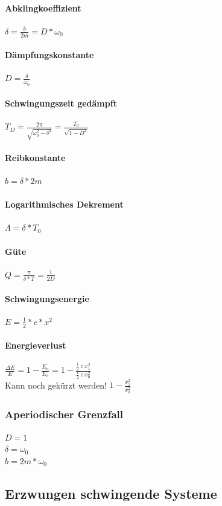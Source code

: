 \documentclass[12pt, a4paper]{scrreprt}
\begin{document}
\paragraph{Abklingkoeffizient} \dotfill \(\delta=\frac{b}{2m}=D*\omega_0\)
\paragraph{Dämpfungskonstante} \dotfill \(D=\frac{\delta}{\omega_0}\)
\paragraph{Schwingungszeit gedämpft} \dotfill \(T_D=\frac{2\pi}{\sqrt{\omega_0^2-\delta^2}}=\frac{T_0}{\sqrt{1-D^2}}\)
\paragraph{Reibkonstante} \dotfill \(b=\delta * 2m\)
\paragraph{Logarithmisches Dekrement} \dotfill \(\Lambda=\delta*T_0\)
\paragraph{Güte} \dotfill \(Q=\frac{\pi}{\delta*T}=\frac{1}{2D}\)
\paragraph{Schwingungsenergie} \dotfill \(E = \frac{1}{2}*c*x^2\)
\paragraph{Energieverlust} \dotfill
\(\frac{\Delta E}{E} = 1-\frac{E_n}{E_v}=1-\frac{\frac{1}{2}\ c\ x_1^2}{\frac{1}{2}\ c\ x_0^2}\)\\
\-\hspace{1.5cm}Kann noch gekürzt werden! \dotfill \(1-\frac{x_1^2}{x_0^2}\)

\subsubsection{Aperiodischer Grenzfall}
\(D=1\)\\
\(\delta=\omega_0\)\\
\(b=2m*\omega_0\)


\subsection{Erzwungen schwingende Systeme}
\end{document}
